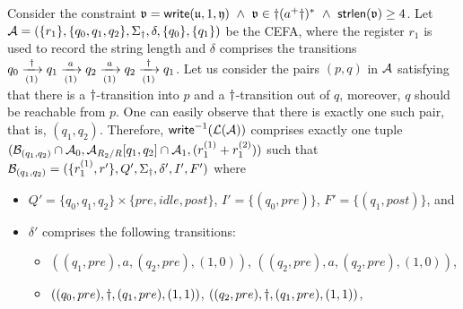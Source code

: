 \begin{example}
Consider the constraint $\mathfrak{v} = \mathsf{write}(\mathfrak{u}, 1, \mathfrak{y})\ \wedge\ \mathfrak{v} \in \dag (a^+ \dag)^*\ \wedge\ \mathsf{strlen}(\mathfrak{v}) \ge 4$. Let $\mathcal{A} = (\{r_1\}, \{q_0, q_1, q_2\}, \Sigma_{\dag}, \delta, \{q_0\}, \{q_1\})$ be the CEFA, where the register $r_1$ is used to record the string length and $\delta$ comprises the transitions $q_0 \xrightarrow[(1)]{\dag} q_1 \xrightarrow[(1)]{a}q_2 \xrightarrow[(1)]{a} q_2 \xrightarrow[(1)]{\dag} q_1$. 
Let us consider the pairs $(p, q)$ in $\mathcal{A}$ satisfying that there is a $\dag$-transition into $p$ and a $\dag$-transition out of $q$, moreover, $q$ should be reachable from $p$.
One can easily observe that there is exactly one such pair, that is, $(q_1, q_2)$. 
Therefore, $\mathsf{write}^{-1}(\mathcal{L}(\mathcal{A}))$ comprises exactly one tuple $(\mathcal{B}_{(q_1, q_2)}\cap \mathcal{A}_0, \mathcal{A}_{R_2/R}[q_1,q_2] \cap \mathcal{A}_1, (r^{(1)}_1+r^{(2)}_1))$ such that
$\mathcal{B}_{(q_1,q_2)} = (\{r^{(1)}_1, r' \}, Q', \Sigma_{\dag}, \delta', I', F')$ where 
\begin{itemize}%
\item $Q' = \{q_0, q_1, q_2\} \times \{pre, idle, post\}$, $I' = \{(q_0, pre)\}$, $F' = \{(q_1, post)\}$, and 
\item $\delta' $ comprises the following transitions:
\begin{itemize}
\item $((q_1, pre), a, (q_2, pre), (1,0))$, $((q_2, pre), a, (q_2, pre), (1,0))$, 

\item $((q_0, pre), \dag, (q_1, pre), (1,1))$, $((q_2, pre), \dag, (q_1, pre), (1,1))$, 


\end{itemize}
\end{itemize}
\end{example}
